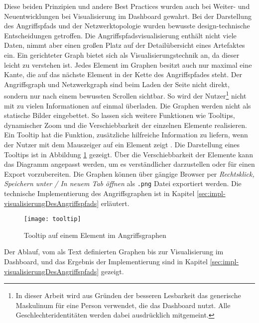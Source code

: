 %
\par Diese beiden Prinzipien und andere Best Practices wurden auch bei Weiter- und Neuentwicklungen bei Visualisierung im Dashboard gewahrt. Bei der Darstellung des Angriffspfads und der Netzwerktopologie wurden bewusste design-technische Entscheidungen getroffen. Die Angriffspfadsvisualisierung enthält nicht viele Daten, nimmt aber einen großen Platz auf der Detailübersicht eines Artefaktes ein. Ein gerichteter Graph bietet sich als Visualisierungstechnik an, da dieser leicht zu verstehen ist. Jedes Element im Graphen besitzt auch nur maximal eine Kante, die auf das nächste Element in der Kette des Angriffspfades steht. Der Angriffsgraph und Netzwerkgraph sind beim Laden der Seite nicht direkt, sondern nur nach einem bewussten Scrollen sichtbar. So wird der Nutzer\footnote{In dieser Arbeit wird aus Gründen der besseren Lesbarkeit das generische Maskulinum für eine Person verwendet, die das Dashboard nutzt. Alle Geschlechteridentitäten werden dabei ausdrücklich mitgemeint.} nicht mit zu vielen Informationen auf einmal überladen. Die Graphen werden nicht als statische Bilder eingebettet. So lassen sich weitere Funktionen wie Tooltips, dynamischer Zoom und die Verschiebbarkeit der einzelnen Elemente realisieren. Ein Tooltip hat die Funktion, zusätzliche hilfreiche Information zu liefern, wenn der Nutzer mit dem Mauszeiger auf ein Element zeigt \autocite{TooltipCarbonDesign}. Die Darstellung eines Tooltips ist in Abbildung \ref{fig:tooltip} gezeigt. Über die Verschiebbarkeit der Elemente kann das Diagramm angepasst werden, um es verständlicher darzustellen oder für einen Export vorzubereiten. Die Graphen können über gängige Browser per \textit{Rechtsklick, Speichern unter / In neuem Tab öffnen} als \verb|.png| Datei exportiert werden. Die technische Implementierung des Angriffsgraphen ist in Kapitel \ref{sec:impl-visualisierungDesAngriffspfads} erläutert.
%
\begin{figure}
    \centering
    \texttt{[image: tooltip]}
    \caption{Tooltip auf einem Element im Angriffsgraphen}
    \label{fig:tooltip}
\end{figure}
%
\par Der Ablauf, vom als Text definierten Graphen bis zur Visualisierung im Dashboard, und das Ergebnis der Implementierung sind in Kapitel \ref{sec:impl-visualisierungDesAngriffspfads} gezeigt.
